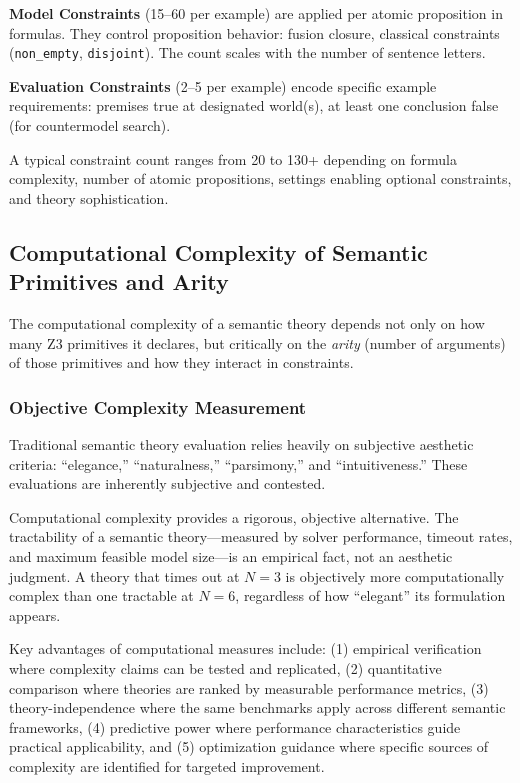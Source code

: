 \documentclass[pdflatex,sn-mathphys-num]{sn-jnl}
\theoremstyle{thmstyleone}
\theoremstyle{thmstyletwo}
\theoremstyle{thmstylethree}
\begin{document}
\textbf{Model Constraints} (15--60 per example) are applied per atomic proposition in formulas.
They control proposition behavior: fusion closure, classical constraints (\texttt{non\_empty}, \texttt{disjoint}).
The count scales with the number of sentence letters.

\textbf{Evaluation Constraints} (2--5 per example) encode specific example requirements: premises true at designated world(s), at least one conclusion false (for countermodel search).

A typical constraint count ranges from 20 to 130+ depending on formula complexity, number of atomic propositions, settings enabling optional constraints, and theory sophistication.

\subsection{Computational Complexity of Semantic Primitives and Arity}\label{sec:complexity}

The computational complexity of a semantic theory depends not only on how many Z3 primitives it declares, but critically on the \emph{arity} (number of arguments) of those primitives and how they interact in constraints.

\subsubsection{Objective Complexity Measurement}

Traditional semantic theory evaluation relies heavily on subjective aesthetic criteria: ``elegance,'' ``naturalness,'' ``parsimony,'' and ``intuitiveness.''
These evaluations are inherently subjective and contested.

Computational complexity provides a rigorous, objective alternative.
The tractability of a semantic theory---measured by solver performance, timeout rates, and maximum feasible model size---is an empirical fact, not an aesthetic judgment.
A theory that times out at $N=3$ is objectively more computationally complex than one tractable at $N=6$, regardless of how ``elegant'' its formulation appears.

Key advantages of computational measures include: (1) empirical verification where complexity claims can be tested and replicated, (2) quantitative comparison where theories are ranked by measurable performance metrics, (3) theory-independence where the same benchmarks apply across different semantic frameworks, (4) predictive power where performance characteristics guide practical applicability, and (5) optimization guidance where specific sources of complexity are identified for targeted improvement.
\end{document}
